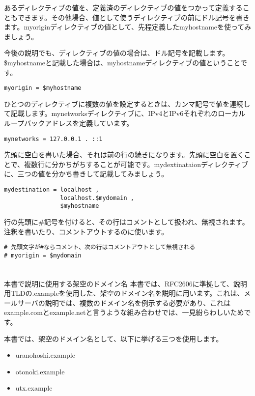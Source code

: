 あるディレクティブの値を、定義済のディレクティブの値をつかって定義することもできます。その他場合、値として使うディレクティブの前にドル記号を書きます。myoriginディレクティブの値として、先程定義したmyhostnameを使ってみましょう。

今後の説明でも、ディレクティブの値の場合は、ドル記号を記載します。\$myhostnameと記載した場合は、myhostnameディレクティブの値ということです。

\begin{lstlisting}[basicstyle=\ttfamily\footnotesize, frame=single]
myorigin = $myhostname
\end{lstlisting}

ひとつのディレクティブに複数の値を設定するときは、カンマ記号で値を連続して記載します。mynetworksディレクティブに、IPv4とIPv6それぞれのローカルループバックアドレスを定義しています。

\begin{lstlisting}[basicstyle=\ttfamily\footnotesize, frame=single]
mynetworks = 127.0.0.1 . ::1
\end{lstlisting}

先頭に空白を書いた場合、それは前の行の続きになります。先頭に空白を置くことで、複数行に分かちがちすることが可能です。mydextinataionディレクティブに、三つの値を分かち書きして記載してみましょう。

\begin{lstlisting}[basicstyle=\ttfamily\footnotesize, frame=single]
mydestination = localhost ,
                localhost.$mydomain ,
                $myhostname
\end{lstlisting}

行の先頭に\#記号を付けると、その行はコメントとして扱われ、無視されます。注釈を書いたり、コメントアウトするのに使います。

\begin{lstlisting}[basicstyle=\ttfamily\footnotesize, frame=single]
# 先頭文字が#ならコメント、次の行はコメントアウトとして無視される
# myorigin = $mydomain
\end{lstlisting}

\section*{}
\begin{itembox}[l]{本書で説明に使用する架空のドメイン名}
本書では、RFC2606に準拠して、説明用TLDの.exampleを使用した、架空のドメイン名を説明に用います。これは、メールサーバの説明では、複数のドメイン名を例示する必要があり、これはexample.comとexample.netと言うような組み合わせでは、一見紛らわしいためです。

本書では、架空のドメイン名として、以下に挙げる三つを使用します。

\begin{itemize}
 \item uranohoshi.example
 \item otonoki.example
 \item utx.example
\end{itemize}
\end{itembox}


